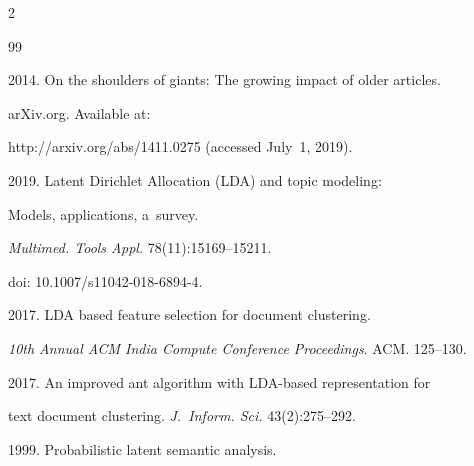  \begin{multicols}{2}





\renewcommand{\bibname}{\protect\rmfamily References}







{\small\frenchspacing


 {%




 \begin{thebibliography}{99}






 2014. On the shoulders of giants: The growing impact of older articles. 


 arXiv.org. Available at: 


 {\sf http://arxiv.org/abs/1411.0275} (accessed July~1, 2019).






2019. Latent Dirichlet Allocation (LDA) and topic modeling: 


Models, applications, a~survey. 


\textit{Multimed. Tools  Appl.} 78(11):15169--15211. 


doi: 10.1007/s11042-018-6894-4.






 2017. LDA based feature selection for document clustering. 


 \textit{10th Annual ACM India Compute Conference Proceedings}. ACM. 125--130.






 2017. An improved ant algorithm with LDA-based representation for


  text document clustering. \textit{J.~Inform. Sci.} 43(2):275--292.






 1999. Probabilistic latent semantic analysis. 



\end{thebibliography}}}
\end{multicols}
